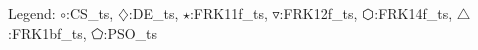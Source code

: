 Legend: {\color{NavyBlue}$\circ$}:CS\_ts, {\color{Magenta}$\diamondsuit$}:DE\_ts, {\color{Orange}$\star$}:FRK11f\_ts, {\color{CornflowerBlue}$\triangledown$}:FRK12f\_ts, {\color{red}$\varhexagon$}:FRK14f\_ts, {\color{YellowGreen}$\triangle$}:FRK1bf\_ts, {\color{cyan}$\pentagon$}:PSO\_ts